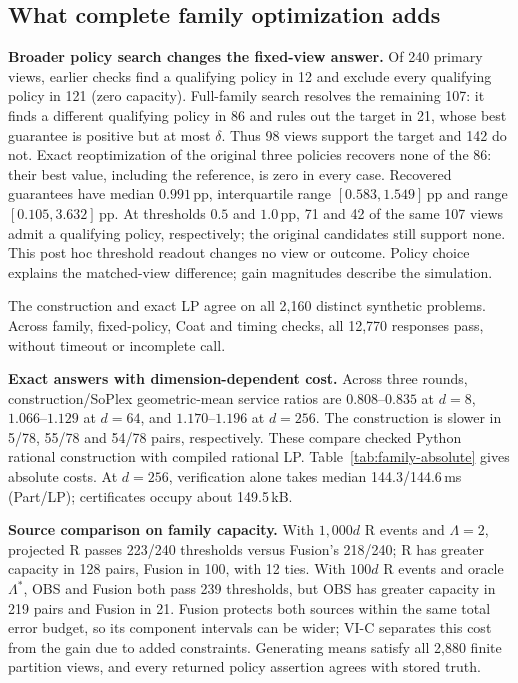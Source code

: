 \subsection{What complete family optimization adds}
\textbf{Broader policy search changes the fixed-view answer.}
Of 240 primary views, earlier checks find a qualifying policy in 12 and exclude every qualifying policy in 121 (zero capacity). Full-family search resolves the remaining 107: it finds a different qualifying policy in 86 and rules out the target in 21, whose best guarantee is positive but at most $\delta$. Thus 98 views support the target and 142 do not.
Exact reoptimization of the original three policies recovers none of the 86:
their best value, including the reference, is zero in every case.
Recovered guarantees have median $0.991$\,pp, interquartile range
$[0.583,1.549]$\,pp and range $[0.105,3.632]$\,pp. At thresholds $0.5$ and $1.0$\,pp, 71 and 42 of the same 107 views admit a qualifying policy, respectively; the original candidates still support none. This post hoc threshold readout changes no view or outcome. Policy choice explains the matched-view difference; gain magnitudes describe the simulation.

The construction and exact LP agree on all 2,160 distinct synthetic problems. Across family, fixed-policy, Coat and timing checks, all 12,770 responses pass, without timeout or incomplete call.

\textbf{Exact answers with dimension-dependent cost.}
Across three rounds, construction/SoPlex
geometric-mean service ratios are $0.808$--$0.835$ at $d=8$,
$1.066$--$1.129$ at $d=64$, and $1.170$--$1.196$ at $d=256$.
The construction is slower in 5/78, 55/78 and 54/78 pairs, respectively.
These compare checked Python rational construction with compiled rational LP.
Table~\ref{tab:family-absolute} gives absolute costs.
At $d=256$, verification alone takes median 144.3/144.6\,ms (Part/LP);
certificates occupy about 149.5\,kB.


\textbf{Source comparison on family capacity.}
With $1{,}000d$ R events and $\Lambda=2$, projected R passes 223/240
thresholds versus Fusion's 218/240; R has greater capacity in 128 pairs,
Fusion in 100, with 12 ties. With $100d$ R events and oracle $\Lambda^*$,
OBS and Fusion both pass 239 thresholds, but OBS has greater capacity
in 219 pairs and Fusion in 21. Fusion protects both sources within the same total error budget, so its component intervals can be wider; VI-C separates this cost from the gain due to added constraints.
Generating means satisfy all 2,880 finite partition views, and every returned
policy assertion agrees with stored truth.
